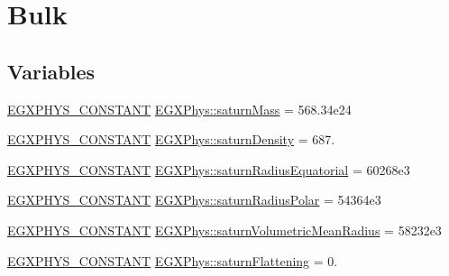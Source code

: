 \hypertarget{group___e_g_x_phys-_constants-_astrophysics-_solar_system-_saturn-_bulk}{}\section{Bulk}
\label{group___e_g_x_phys-_constants-_astrophysics-_solar_system-_saturn-_bulk}
\subsection*{Variables}
\begin{DoxyCompactItemize}
\item 
\mbox{\hyperlink{group___e_g_x_phys-_constants-_macros_ga76980d288494ce1714c9ac68a95ba702}{E\+G\+X\+P\+H\+Y\+S\+\_\+\+C\+O\+N\+S\+T\+A\+NT}} \mbox{\hyperlink{group___e_g_x_phys-_constants-_astrophysics-_solar_system-_saturn-_bulk_gaa1f93285c764fe2bd26429609e8dfb3f}{E\+G\+X\+Phys\+::saturn\+Mass}} = 568.\+34e24
\item 
\mbox{\hyperlink{group___e_g_x_phys-_constants-_macros_ga76980d288494ce1714c9ac68a95ba702}{E\+G\+X\+P\+H\+Y\+S\+\_\+\+C\+O\+N\+S\+T\+A\+NT}} \mbox{\hyperlink{group___e_g_x_phys-_constants-_astrophysics-_solar_system-_saturn-_bulk_gacf0ffaf60d1b37b373cc4addf1c7b737}{E\+G\+X\+Phys\+::saturn\+Density}} = 687.
\item 
\mbox{\hyperlink{group___e_g_x_phys-_constants-_macros_ga76980d288494ce1714c9ac68a95ba702}{E\+G\+X\+P\+H\+Y\+S\+\_\+\+C\+O\+N\+S\+T\+A\+NT}} \mbox{\hyperlink{group___e_g_x_phys-_constants-_astrophysics-_solar_system-_saturn-_bulk_gaaf3daee394b6d056e04390cf2c2a42a6}{E\+G\+X\+Phys\+::saturn\+Radius\+Equatorial}} = 60268e3
\item 
\mbox{\hyperlink{group___e_g_x_phys-_constants-_macros_ga76980d288494ce1714c9ac68a95ba702}{E\+G\+X\+P\+H\+Y\+S\+\_\+\+C\+O\+N\+S\+T\+A\+NT}} \mbox{\hyperlink{group___e_g_x_phys-_constants-_astrophysics-_solar_system-_saturn-_bulk_gad678086368931db863e6d48445f6459b}{E\+G\+X\+Phys\+::saturn\+Radius\+Polar}} = 54364e3
\item 
\mbox{\hyperlink{group___e_g_x_phys-_constants-_macros_ga76980d288494ce1714c9ac68a95ba702}{E\+G\+X\+P\+H\+Y\+S\+\_\+\+C\+O\+N\+S\+T\+A\+NT}} \mbox{\hyperlink{group___e_g_x_phys-_constants-_astrophysics-_solar_system-_saturn-_bulk_gad30162a5ce60a292e31e1c38db97e03c}{E\+G\+X\+Phys\+::saturn\+Volumetric\+Mean\+Radius}} = 58232e3
\item 
\mbox{\hyperlink{group___e_g_x_phys-_constants-_macros_ga76980d288494ce1714c9ac68a95ba702}{E\+G\+X\+P\+H\+Y\+S\+\_\+\+C\+O\+N\+S\+T\+A\+NT}} \mbox{\hyperlink{group___e_g_x_phys-_constants-_astrophysics-_solar_system-_saturn-_bulk_gaaae334c1007139bf7af123c126431fc8}{E\+G\+X\+Phys\+::saturn\+Flattening}} = 0.

\end{DoxyCompactItemize}
